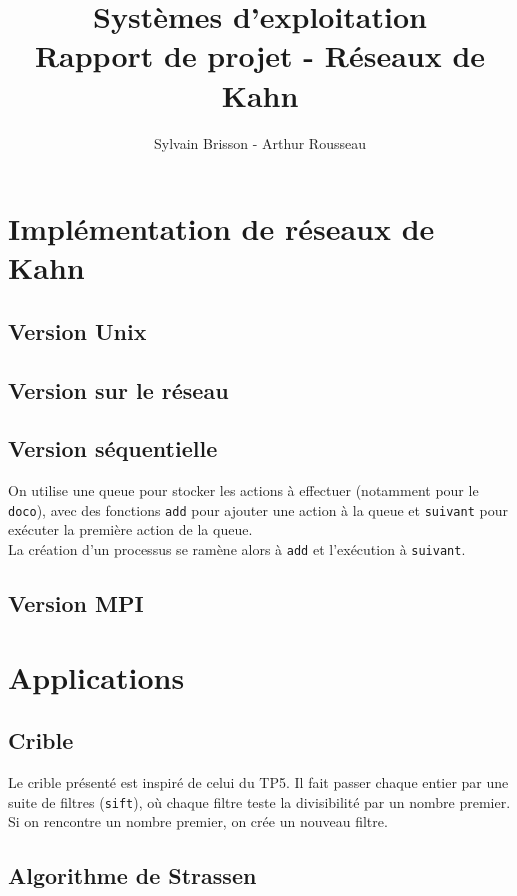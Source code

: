 \documentclass[a4paper]{article}
\title{Systèmes d'exploitation\\Rapport de projet - Réseaux de Kahn}
\author{Sylvain Brisson - Arthur Rousseau}
\date{}
\begin{document}
    \maketitle
    \noindent
    \section{Implémentation de réseaux de Kahn}
    \subsection{Version Unix}
    \subsection{Version sur le réseau}
    \subsection{Version séquentielle}
        On utilise une queue pour stocker les actions à effectuer (notamment pour le \texttt{doco}), avec des fonctions \texttt{add} pour ajouter une action à la queue et \texttt{suivant} pour exécuter la première action de la queue.\\
        La création d'un processus se ramène alors à \texttt{add} et l'exécution à \texttt{suivant}.
    \subsection{Version MPI}
    \section{Applications}
    \subsection{Crible}
        Le crible présenté est inspiré de celui du TP5. Il fait passer chaque entier par une suite de filtres (\texttt{sift}), où chaque filtre teste la divisibilité par un nombre premier. Si on rencontre un nombre premier, on crée un nouveau filtre.
    \subsection{Algorithme de Strassen}
\end{document}
